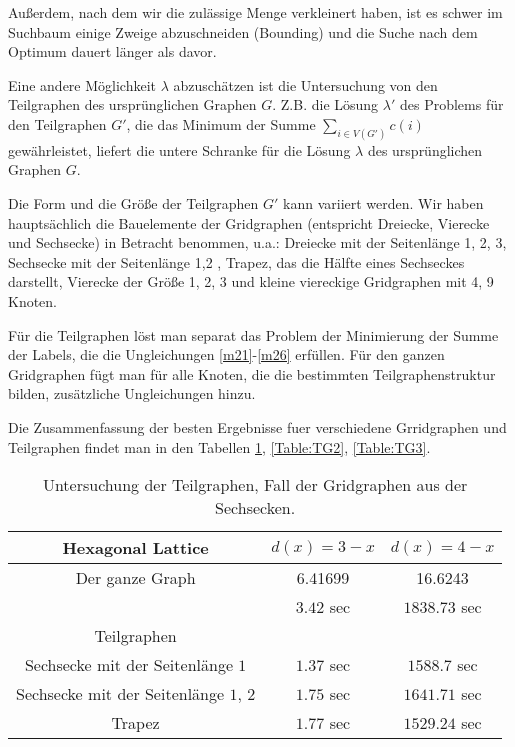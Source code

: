 \documentclass[
	fontsize=12pt,
	paper=a4,
	twoside=false,
	numbers=noenddot,
	plainheadsepline,
	toc=listof,
	toc=bibliography
]{scrartcl}
\begin{document}
\begin{itemize}
	Außerdem, nach dem wir die zulässige Menge verkleinert haben, ist es schwer im Suchbaum einige Zweige abzuschneiden (Bounding) und die Suche nach dem Optimum dauert länger als davor.
	
	Eine andere Möglichkeit $\lambda$ abzuschätzen ist die Untersuchung von den Teilgraphen des ursprünglichen Graphen $G$. Z.B. die Lösung $\lambda'$ des Problems für den Teilgraphen $G'$, die das Minimum der Summe $\sum_{i\in V(G')}{c(i)}$ gewährleistet, liefert die untere Schranke für die Lösung $\lambda$ des ursprünglichen Graphen $G$.
	
	Die Form und die Größe der Teilgraphen $G'$ kann variiert werden. Wir haben hauptsächlich die Bauelemente der Gridgraphen (entspricht Dreiecke, Vierecke und Sechsecke) in Betracht benommen, u.a.: Dreiecke mit der Seitenlänge 1, 2, 3, Sechsecke mit der Seitenlänge 1,2 , Trapez, das die Hälfte eines Sechseckes darstellt, Vierecke der Größe 1, 2, 3 und kleine viereckige Gridgraphen mit 4, 9 Knoten. 
	
	Für die Teilgraphen löst man separat das Problem der Minimierung der Summe der Labels, die die Ungleichungen \ref{m21}-\ref{m26} erfüllen. Für den ganzen Gridgraphen fügt man für alle Knoten, die die bestimmten Teilgraphenstruktur bilden, zusätzliche Ungleichungen hinzu.
	
	Die Zusammenfassung der besten Ergebnisse fuer verschiedene Grridgraphen und Teilgraphen findet man in den Tabellen \ref{Table:TG1}, \ref{Table:TG2}, \ref{Table:TG3}.

	\begin{table}[htbp]
	\centering
	\begin{tabular}{|c|c|c|}
	\hline Hexagonal Lattice& $d(x)=3-x$  & $d(x)=4-x$\\ \hline 
		Der ganze Graph	&  6.41699	& 16.6243 \\ 
			& $3.42$ sec	& $1838.73$ sec \\ \hline
		Teilgraphen & & \\\hline
		Sechsecke mit der Seitenlänge $1$& $1.37$ sec	&  $1588.7$ sec \\ \hline
		Sechsecke mit der Seitenlänge $1$, $2$	& $1.75$ sec	&  $1641.71$ sec \\ \hline
		Trapez& $1.77$ sec	&  $1529.24$ sec \\ \hline
	\end{tabular}
	\caption{Untersuchung der Teilgraphen, Fall der Gridgraphen aus der Sechsecken.} 
	\label{Table:TG1}
	\end{table}
	

\end{itemize}
\end{document}
